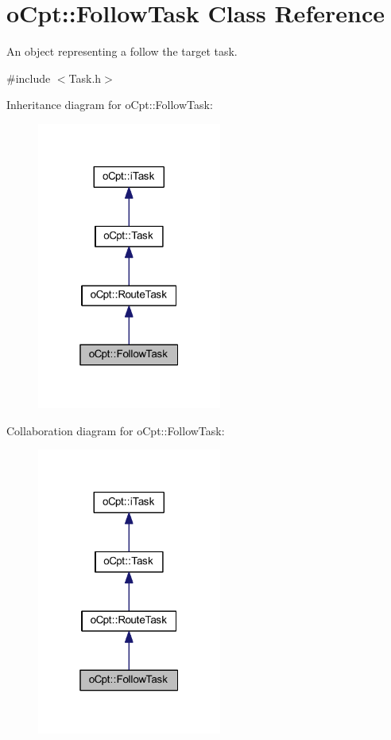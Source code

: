 \hypertarget{classo_cpt_1_1_follow_task}{}\section{o\+Cpt\+:\+:Follow\+Task Class Reference}
\label{classo_cpt_1_1_follow_task}


An object representing a follow the target task.  




{\ttfamily \#include $<$Task.\+h$>$}



Inheritance diagram for o\+Cpt\+:\+:Follow\+Task\+:\nopagebreak
\begin{figure}[H]
\begin{center}
\leavevmode
\includegraphics[width=172pt]{classo_cpt_1_1_follow_task__inherit__graph}
\end{center}
\end{figure}


Collaboration diagram for o\+Cpt\+:\+:Follow\+Task\+:\nopagebreak
\begin{figure}[H]
\begin{center}
\leavevmode
\includegraphics[width=172pt]{classo_cpt_1_1_follow_task__coll__graph}
\end{center}
\end{figure}
